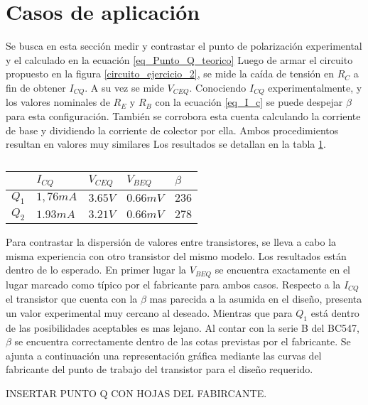 \section{Casos de aplicación}

Se busca en esta sección medir y contrastar el punto de polarización experimental y el calculado en la ecuación \ref{eq_Punto_Q_teorico}
Luego de armar el circuito propuesto en la figura \ref{circuito_ejercicio_2}, se mide la caída de tensión en $R_C$ a fin de obtener $I_{CQ}$. A su vez se mide $V_{CEQ}$.
Conociendo $I_{CQ}$ experimentalmente, y los valores nominales de $R_E$ y $R_B$ con la ecuación \ref{eq_I_c} se puede despejar $\beta$ para esta configuración. También se corrobora esta cuenta calculando la corriente de base y dividiendo la corriente de colector por ella.
Ambos procedimientos resultan en valores muy similares
Los resultados se detallan en la tabla \ref{tabla_resultados_polarizacion}.

\begin{table}[ht]
    \centering
    \begin{tabular}{|l|l|l|l|l|}
    \hline
          & $I_{CQ}$  & $V_{CEQ}$ & $V_{BEQ}$ & $\beta$ \\ \hline
    $Q_1$ & $1,76 mA$ & $3.65 V$ & $0.66 mV$  & $236$   \\ \hline
    $Q_2$ & $1.93 mA$ & $3.21 V$  & $0.66 mV$ & $278$   \\ \hline
    \end{tabular}
    \caption{}\label{tabla_resultados_polarizacion}
\end{table}
Para contrastar la dispersión de valores entre transistores, se lleva a cabo la misma experiencia con otro transistor del mismo modelo.
Los resultados están dentro de lo esperado. En primer lugar la $V_{BEQ}$ se encuentra exactamente en el lugar marcado como típico por el fabricante para ambos casos.
Respecto a la $I_{CQ}$ el transistor que cuenta con la $\beta$ mas parecida a la asumida en el diseño, presenta un valor experimental muy cercano al deseado. Mientras que para $Q_1$ está dentro de las posibilidades aceptables es mas lejano. 
Al contar con la serie B del BC547, $\beta$ se encuentra correctamente dentro de las cotas previstas por el fabricante.
Se ajunta a continuación una representación gráfica mediante las curvas del fabricante del punto de trabajo del transistor para el diseño requerido.

INSERTAR PUNTO Q CON HOJAS DEL FABIRCANTE.